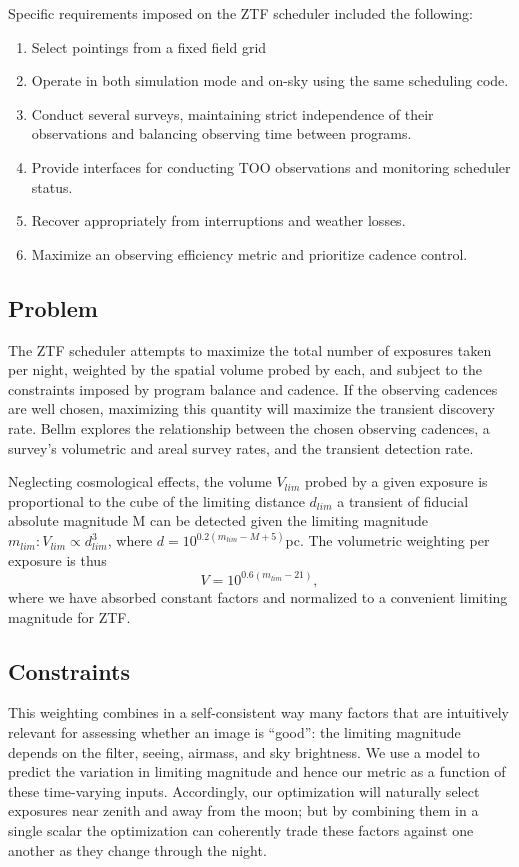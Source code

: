 \documentclass{article}
\begin{document}
Specific requirements imposed on the ZTF scheduler
included the following:

\begin{enumerate}
    \item Select pointings from a fixed field grid
    \item  Operate in both simulation mode and on-sky using the same scheduling code.
    \item Conduct several surveys, maintaining strict independence of their observations and balancing observing time between programs.
    \item Provide interfaces for conducting TOO observations and monitoring scheduler status.
    \item Recover appropriately from interruptions and weather losses.
    \item Maximize an observing efficiency metric and prioritize cadence control.
\end{enumerate}

\subsection*{Problem}

The ZTF scheduler attempts to maximize the total
number of exposures taken per night, weighted by the spatial
volume probed by each, and subject to the constraints imposed by
program balance and cadence. If the observing
cadences are well chosen, maximizing this quantity will maximize
the transient discovery rate. Bellm explores the relationship
between the chosen observing cadences, a survey’s volumetric
and areal survey rates, and the transient detection rate.

Neglecting cosmological effects, the volume \(V_{lim}\) probed by
a given exposure is proportional to the cube of the limiting
distance \(d_{lim}\) a transient of fiducial absolute magnitude M can
be detected given the limiting magnitude \(m_{lim}: V_{lim} \propto d_{lim}^3\),
where \(d = 10^{0.2(m_{lim}-M+5)}\)pc. The volumetric
weighting per exposure is thus \[V = 10^{0.6(m_{lim} - 21)},\]
where we have absorbed constant factors and normalized to a
convenient limiting magnitude for ZTF.

\subsection*{Constraints}
This weighting combines in a self-consistent way many
factors that are intuitively relevant for assessing whether an
image is “good”: the limiting magnitude depends on the filter,
seeing, airmass, and sky brightness. We use a model
to predict the variation in limiting magnitude and
hence our metric as a function of these time-varying inputs.
Accordingly, our optimization will naturally select exposures
near zenith and away from the moon; but by combining them in
a single scalar the optimization can coherently trade these
factors against one another as they change through the night.
\end{document}
